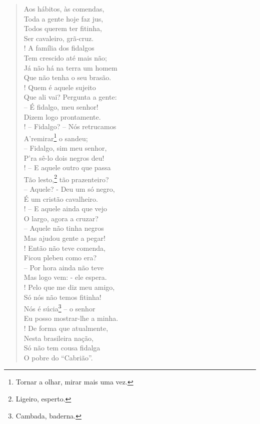 \begin{verse}
Aos hábitos, às comendas,\\
Toda a gente hoje faz jus,\\
Todos querem ter fitinha,\\
Ser cavaleiro, grã-cruz.\\!
A família dos fidalgos\\
Tem crescido até mais não;\\
Já não há na terra um homem\\
Que não tenha o seu brasão.\\!
Quem é aquele sujeito\\
Que ali vai? Pergunta a gente:\\
-- É fidalgo, meu senhor!\\
Dizem logo prontamente.\\!
-- Fidalgo? -- Nós retrucamos\\
A'remirar\footnote{ Tornar a olhar, mirar mais uma vez.} o sandeu;\\
-- Fidalgo, sim meu senhor,\\
P'ra sê-lo dois negros deu!\\!
-- E aquele outro que passa\\
Tão lesto,\footnote{ Ligeiro, esperto.} tão prazenteiro?\\
-- Aquele? - Deu um só negro,\\
É um cristão cavalheiro.\\!
-- E aquele ainda que vejo\\
O largo, agora a cruzar?\\
-- Aquele não tinha negros\\
Mas ajudou gente a pegar!\\!
Então não teve comenda,\\
Ficou plebeu como era?\\
-- Por hora ainda não teve\\
Mas logo vem: - ele espera.\\!
Pelo que me diz meu amigo,\\
Só nós não temos fitinha!\\
Nós é súcia\footnote{ Cambada, baderna.} -- o senhor\\
Eu posso mostrar-lhe a minha.\\!
De forma que atualmente,\\
Nesta brasileira nação,\\
Só não tem cousa fidalga\\
O pobre do ``Cabrião''.
\end{verse}

